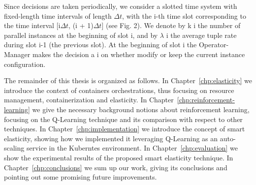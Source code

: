 Since decisions are taken periodically, we consider a slotted time system with
fixed-length time intervals of length $\Delta t$, with the i-th time slot corresponding
to the time interval [i$\Delta t$, (i + 1)$\Delta t$] (see Fig. 2). We denote by k i the number
of parallel instances at the beginning of slot i, and by $\lambda$ i the average tuple rate
during slot i-1 (the previous slot). At the beginning of slot i the Operator-
Manager makes the decision a i on whether modify or keep the current instance
configuration.


The remainder of this thesis is organized as follows.
%
In Chapter~\ref{chp:elasticity} we introduce the context of containers orchestrations, thus focusing on resource management, containerization and elasticity.
%
In Chapter~\ref{chp:reinforcement-learning} we give the necessary background notions about reinforcement learning, focusing on the Q-Learning technique and its comparison with respect to other techniques.
%
In Chapter~\ref{chp:implementation} we introduce the concept of smart elasticity, showing how we implemented it leveraging Q-Learning as an auto-scaling service in the Kuberntes environment.
%
In Chapter~\ref{chp:evaluation} we show the experimental results of the proposed smart elasticity technique.
%
In Chapter~\ref{chp:conclusions} we sum up our work, giving its conclusions and pointing out some promising future improvements.
